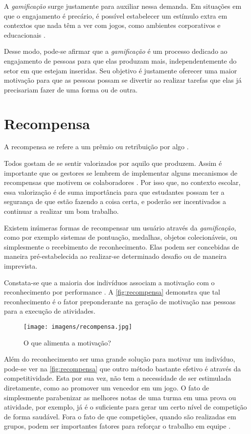 A \textit{gamificação} surge justamente para auxiliar nessa demanda. Em situações em que o engajamento é precário, é possível estabelecer um estímulo extra em contextos que nada têm a ver com jogos, como ambientes corporativos e educacionais
\cite{gamificacao-corporativa:2017}.


Desse modo, pode-se afirmar que a \textit{gamificação} é um processo dedicado ao engajamento de pessoas para que elas produzam mais, independentemente do setor em que estejam inseridas. Seu objetivo é justamente oferecer uma maior motivação para que as pessoas possam se divertir ao realizar tarefas que elas já precisariam fazer de uma forma ou de outra. \cite{gamificacao-corporativa:2017}

\section{Recompensa}
A recompensa se refere a um prêmio ou retribuição por algo \cite{dicio-recompensa:2009}.


Todos gostam de se sentir valorizados por aquilo que produzem. Assim é importante que os gestores se lembrem de implementar alguns mecanismos de recompensas que motivem os colaboradores \cite{gamificacao-corporativa:2017}. Por isso que, no contexto escolar, essa valorização é de suma importância para que estudantes possam ter a segurança de que estão fazendo a coisa certa, e poderão ser incentivados a continuar a realizar um bom trabalho.

Existem inúmeras formas de recompensar um usuário através da \textit{gamificação}, como por exemplo sistemas de pontuação, medalhas, objetos colecionáveis, ou simplesmente o recebimento de reconhecimento. Elas podem ser concebidas de maneira pré-estabelecida ao realizar-se determinado desafio ou de maneira imprevista.


Constata-se que a maioria dos indivíduos associam a motivação com o reconhecimento por performance \cite{grafico-motivacao:2012}. A \autoref{fig:recompensa} demonstra que tal reconhecimento é o fator preponderante na geração de motivação nas pessoas para a execução de atividades.

\begin{figure}[htb]
    \centering
	\texttt{[image: imagens/recompensa.jpg]}
	\caption{\label{fig:recompensa}O que alimenta a motivação?}
\end{figure}
\FloatBarrier

Além do reconhecimento ser uma grande solução para motivar um indivíduo, pode-se ver na \autoref{fig:recompensa} que outro método bastante efetivo é através da competitividade. Esta por sua vez, não tem a necessidade de ser estimulada diretamente, como ao promover um vencedor em um jogo. O fato de simplesmente parabenizar as melhores notas de uma turma em uma prova ou atividade, por exemplo, já é o suficiente para gerar um certo nível de competição de forma saudável. Fora o fato de que competições, quando são realizadas em grupos, podem ser importantes fatores para reforçar o trabalho em equipe \cite{gamificação-na-ead:2014}.


